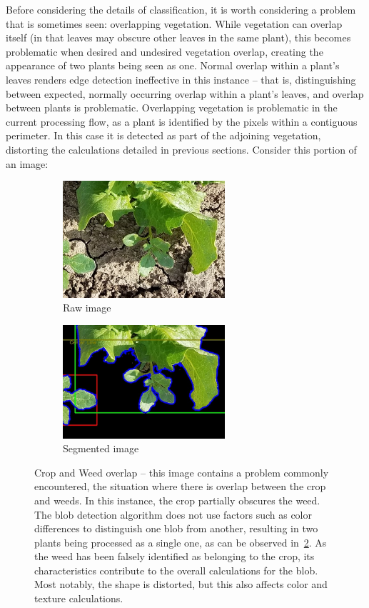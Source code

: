 \documentclass[letterpaper]{article}
\begin{document}
{Before considering the details of classification, it is worth considering a problem that is sometimes seen: overlapping vegetation. While vegetation can overlap itself (in that leaves may obscure other leaves in the same plant), this becomes problematic when desired and undesired vegetation overlap, creating the appearance of two plants being seen as one. Normal overlap within a plant's leaves renders edge detection ineffective in this instance -- that is, distinguishing between expected, normally occurring overlap within a plant's leaves, and overlap between plants is problematic. Overlapping vegetation is problematic in the current processing flow, as a plant is identified by the pixels within a contiguous  perimeter. In this case it is detected as part of the adjoining vegetation, distorting the calculations detailed in previous sections.  Consider this portion of an image:
\begin{figure}[H]
	\centering
	\begin{subfigure}[h]{.45\textwidth}
		\centering
		\includegraphics[width=6cm]{./figures/overlapping-weed.jpg}
		\caption{Raw image}
		\label{fig:overlap-raw}
	\end{subfigure}
	\hfill
	\begin{subfigure}[h]{.45\textwidth}
		\centering
		\includegraphics[width=6cm]{./figures/overlapping-weed-segmented.jpg}
		\caption{Segmented image}
		\label{fig:overlap-segmented}
	\end{subfigure}
	\caption[Crop and Weed overlap]{Crop and Weed overlap -- this image contains a problem commonly encountered, the situation where there is overlap between the crop and weeds. In this instance, the crop partially obscures the weed. The blob detection algorithm does not use factors such as color differences to distinguish one blob from another, resulting in two plants being processed as a single one, as can be observed in~\ref{fig:overlap-segmented}. As the weed has been falsely identified as belonging to the crop, its characteristics contribute to the overall calculations for the blob. Most notably, the shape is distorted, but this also affects color and texture calculations.}
	\label{fig:overlap}
\end{figure}


}
\end{document}
